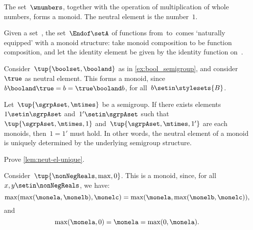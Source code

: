 \begin{example}
    The set~$\wnumbers$, together with the operation of multiplication of whole numbers, forms a monoid.
    The neutral element is the number~$1$.
\end{example}

\begin{example}
    Given a set~\setA, the set~$\Endof\setA$ of functions from~\setA to~\setA comes `naturally equipped' with a monoid structure: take monoid composition to be function composition, and let the identity element be given by the identity function on~\setA.
\end{example}

\begin{example}
    \label{ex:bool_monoid}
    Consider~$\tup{\boolset,\booland}$ as in \cref{ex:bool_semigroup}, and consider~$\true$ as neutral element.
    This forms a monoid, since~$b\booland \true=b=\true \booland b$, for all~$b\setin \stylesets{B}$.
\end{example}

\begin{lemma}
    \label{lem:neut-el-unique}
    Let~$\tup{\sgrpAset, \mtimes}$ be a semigroup.
    If there exists elements~$1 \setin \sgrpAset$ and~$1' \setin \sgrpAset$ such that~$\tup{\sgrpAset, \mtimes, 1}$ and~$\tup{\sgrpAset, \mtimes, 1'}$ are each monoids, then~$1 = 1'$ must hold.
    In other words, the neutral element of a monoid is uniquely determined by the underlying semigroup structure.
\end{lemma}

\begin{gradedexercise}
    \label{ex:UniqueNeutralMonoid}
    Prove \cref{lem:neut-el-unique}.
\end{gradedexercise}


\begin{example}
    Consider~$\tup{\nonNegReals,\max,0}$.
    This is a monoid, since, for all~$x,y\setin \nonNegReals$, we have:
    \begin{equation}
        \max(\max(\monela,\monelb),\monelc)=\max(\monela,\max(\monelb,\monelc)),
    \end{equation}
    and
    \begin{equation}
        \max(\monela,0)=\monela=\max(0,\monela).
    \end{equation}
\end{example}

